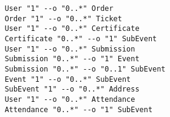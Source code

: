 \begin{verbatim}
    User "1" --o "0..*" Order
    Order "1" --o "0..*" Ticket
    User "1" --o "0..*" Certificate
    Certificate "0..*" --o "1" SubEvent
    User "1" --o "0..*" Submission
    Submission "0..*" --o "1" Event
    Submission "0..*" --o "0..1" SubEvent
    Event "1" --o "0..*" SubEvent
    SubEvent "1" --o "0..*" Address
    User "1" --o "0..*" Attendance
    Attendance "0..*" --o "1" SubEvent
\end{verbatim}
